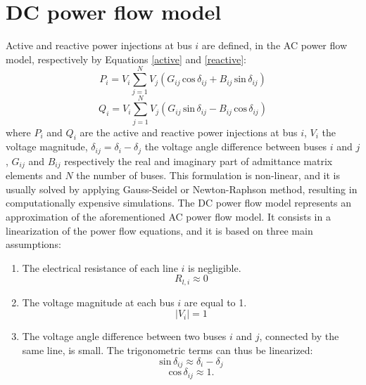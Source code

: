 \documentclass[review]{elsarticle}
\begin{document}
\section{DC power flow model}
Active and reactive power injections at bus $i$ are defined, in the AC power flow model, respectively by Equations \ref{active} and \ref{reactive}:
\begin{equation}
    P_i = V_i\sum_{j=1}^N V_j(G_{ij}\,\text{cos}\,\delta_{ij}+B_{ij}\,\text{sin}\,\delta_{ij})
    \label{active}
\end{equation}
\begin{equation}
    Q_i = V_i\sum_{j=1}^N V_j(G_{ij}\,\text{sin}\,\delta_{ij}-B_{ij}\,\text{cos}\,\delta_{ij})
    \label{reactive}
\end{equation}
where $P_i$ and $Q_i$ are the active and reactive power injections at bus $i$, $V_i$ the voltage magnitude, $\delta_{ij}=\delta_i-\delta_j$ the voltage angle difference between buses $i$ and $j$, $G_{ij}$ and $B_{ij}$ respectively the real and imaginary part of admittance matrix elements and $N$ the number of buses. This formulation is non-linear, and it is usually solved by applying Gauss-Seidel or Newton-Raphson method, resulting in computationally expensive simulations. The DC power flow model represents an approximation of the aforementioned AC power flow model. It consists in a linearization of the power flow equations, and it is based on three main assumptions:
\begin{enumerate}
    \item The electrical resistance of each line $i$ is negligible.
    \begin{equation}
        R_{l,i} \approx 0
    \end{equation}
    \item The voltage magnitude at each bus $i$ are equal to 1.
    \begin{equation}
        |V_{i}| = 1
    \end{equation}    
    \item The voltage angle difference between two buses $i$ and $j$, connected by the same line, is small. The trigonometric terms can thus be linearized:
    \begin{equation}
        \text{sin}\,\delta_{ij} \approx \delta_i - \delta_j
    \end{equation}
    \begin{equation}
        \text{cos}\,\delta_{ij} \approx 1.
    \end{equation}
\end{enumerate}
\end{document}
